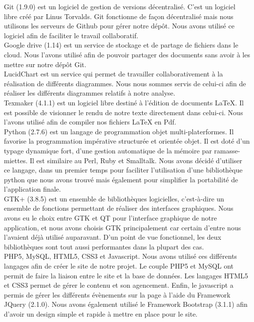 \documentclass[16pts]{report}
\begin{document}
Git (1.9.0) est un logiciel de gestion de versions décentralisé.
C'est un logiciel libre créé par Linus Torvalds.
Git fonctionne de façon décentralisé mais nous utilisons les serveurs de Github pour gérer notre dépôt.
Nous avons utilisé ce logiciel afin de faciliter le travail collaboratif.
\\
Google drive (1.14) est un service de stockage et de partage de fichiers dans le cloud. Nous l'avons utilisé afin de pouvoir partager des documents sans avoir à les mettre sur notre dépôt Git. 
\\
LucidChart est un service qui permet de travailler collaborativement à la réalisation de différents diagrammes. Nous nous sommes servis de celui-ci afin de réaliser les différents diagrammes relatifs à notre analyse.
\\
Texmaker (4.1.1) est un logiciel libre destiné à l'édition de documents LaTeX. Il est possible de visionner le rendu de notre texte directement dans celui-ci. Nous l'avons utilisé afin de compiler nos fichiers LaTeX en Pdf.
\\
Python (2.7.6) est un langage de programmation objet multi-platerformes.  Il favorise la programmation impérative structurée et orientée objet. Il est doté d'un typage dynamique fort, d'une gestion automatique de la mémoire par ramasse-miettes. Il est similaire au Perl, Ruby et Smalltalk. Nous avons décidé d'utiliser ce langage, dans un premier temps pour faciliter l'utilisation d'une bibliothèque python que nous avons trouvé mais également pour simplifier la portabilité de l'application finale.
\\
GTK+ (3.8.5) est un ensemble de bibliothèques logicielles, c'est-à-dire un ensemble de fonctions permettant de réaliser des interfaces graphiques. Nous avons eu le choix entre GTK et QT pour l'interface graphique de notre application, et nous avons choisis GTK principalement car certain d'entre nous l'avaient déjà utilisé auparavant. D'un point de vue fonctionnel, les deux bibliothèques sont tout aussi performantes dans la plupart des cas.
\\
PHP5, MySQL, HTML5, CSS3 et Javascript. Nous avons utilisé ces différents langages afin de créer le site de notre projet. Le couple PHP5 et MySQL ont permit de faire la liaison entre le site et la base de données. Les langages HTML5 et CSS3 permet de gérer le contenu et son agencement. Enfin, le javascript a permis de gérer les différents évènements sur la page à l'aide du Framework JQuery (2.1.0). Nous avons également utilisé le Framework Bootstrap (3.1.1) afin d'avoir un design simple et rapide à mettre en place pour le site.
\end{document}
